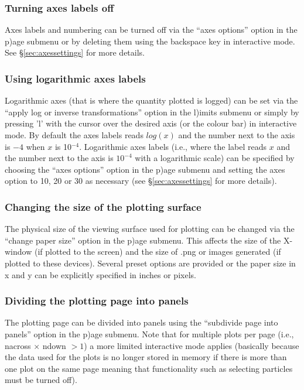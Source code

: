 \documentclass[a4paper,10pt]{article}
\begin{document}
\subsubsection{ Turning axes labels off}
 Axes labels and numbering can be turned off via the ``axes options'' option in the p)age submenu or by deleting them using the backspace key in interactive mode. See \S\ref{sec:axessettings} for more details. 

\subsubsection{ Using logarithmic axes labels}
\label{sec:loglabels}
 Logarithmic axes (that is where the quantity plotted is logged) can be set via the ``apply log or inverse transformations'' option in the l)imits submenu or simply by pressing 'l' with the cursor over the desired axis (or the colour bar) in interactive mode. By default the axes labels reads $log(x)$ and the number next to the axis is $-4$ when $x$ is 10$^{-4}$. Logarithmic axes labels (i.e., where the label reads $x$ and the number next to the axis is $10^{-4}$ with a logarithmic scale) can be specified by choosing the ``axes options'' option in the p)age submenu and setting the axes option to 10, 20 or 30 as necessary (see \S\ref{sec:axessettings} for more details). 

\subsubsection{ Changing the size of the plotting surface}
\label{sec:papersize}
 The physical size of the viewing surface used for plotting can be changed via the ``change paper size'' option in the p)age submenu. This affects the size of the X-window (if plotted to the screen) and the size of .png or images generated (if plotted to these devices). Several preset options are provided or the paper size in x and y can be explicitly specified in inches or pixels.

\subsubsection{ Dividing the plotting page into panels}
\label{sec:nacrossndown}
The plotting page can be divided into panels using the ``subdivide page into panels'' option in the p)age submenu. Note that for multiple plots per page (i.e., nacross $\times$ ndown $> 1$) a more limited interactive mode applies (basically because the data used for the plots is no longer stored in memory if there is more than one plot on the same page meaning that functionality such as selecting particles must be turned off).
\end{document}
